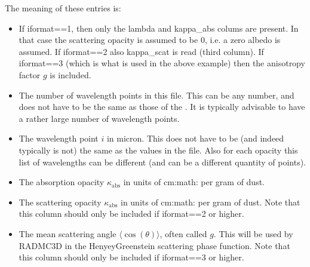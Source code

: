 \documentclass[letterpaper,10pt,english]{sphinxmanual}
\begin{document}
The meaning of these entries is:
\begin{itemize}
\item {} 
 If iformat==1, then only the lambda and
kappa\_abs colums are present. In that case the scattering opacity is
assumed to be 0, i.e. a zero albedo is assumed. If iformat==2 also
kappa\_scat is read (third column). If iformat==3 (which is what is used in
the above example) then  the anisotropy factor \(g\) is included.

\item {} 
 The number of wavelength points in this file. This
can be any number, and does not have to be the same as those of the
. It is typically advisable to have a rather
large number of wavelength points.

\item {} 
 The wavelength point \(i\) in micron. This does
not have to be (and indeed typically is not) the same as the values in the
 file. Also for each opacity this list of
wavelengths can be different (and can be a different quantity of points).

\item {} 
 The absorption opacity \(\kappa_{\mathrm{abs}}\) in units of cm:math: per gram of dust.

\item {} 
 The scattering opacity \(\kappa_{\mathrm{abs}}\) in units of cm:math:
per gram of dust. Note that this column should only be included if
iformat==2 or higher.

\item {} 
 The mean scattering angle
\(\langle\cos(\theta)\rangle\), often called \(g\). This will be used by
RADMC\sphinxhyphen{}3D in the Henyey\sphinxhyphen{}Greenstein scattering phase function. Note that
this column should only be included if iformat==3 or higher.

\end{itemize}
\end{document}
